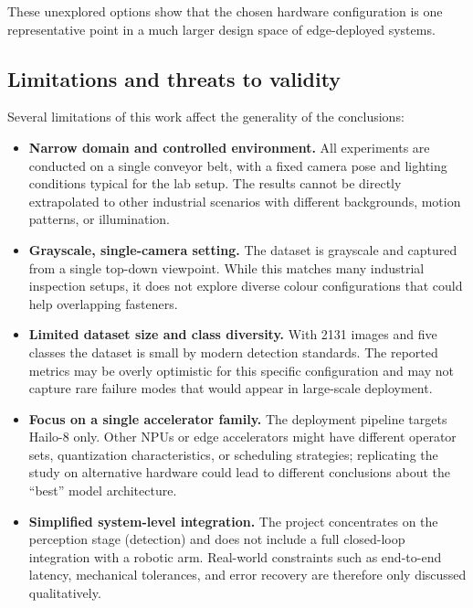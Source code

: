 \documentclass[12pt,a4paper]{report}
\begin{document}
These unexplored options show that the chosen hardware configuration is one
representative point in a much larger design space of edge-deployed systems.


\subsection{Limitations and threats to validity}

Several limitations of this work affect the generality of the conclusions:

\begin{itemize}[leftmargin=1.5em]
    \item \textbf{Narrow domain and controlled environment.}
          All experiments are conducted on a single conveyor belt, with a fixed camera pose
          and lighting conditions typical for the lab setup.
          The results cannot be directly extrapolated to other industrial scenarios with
          different backgrounds, motion patterns, or illumination.

    \item \textbf{Grayscale, single-camera setting.}
          The dataset is grayscale and captured from a single top-down viewpoint.
          While this matches many industrial inspection setups, it does not explore diverse
          colour configurations that could help overlapping fasteners.

    \item \textbf{Limited dataset size and class diversity.}
          With 2131 images and five classes the dataset is small by modern detection standards.
          The reported metrics may be overly optimistic for this specific configuration and may
          not capture rare failure modes that would appear in large-scale deployment.

    \item \textbf{Focus on a single accelerator family.}
          The deployment pipeline targets Hailo-8 only.
          Other NPUs or edge accelerators might have different operator sets, quantization
          characteristics, or scheduling strategies; replicating the study on alternative hardware
          could lead to different conclusions about the \enquote{best} model architecture.

    \item \textbf{Simplified system-level integration.}
          The project concentrates on the perception stage (detection) and does not include a
          full closed-loop integration with a robotic arm.
          Real-world constraints such as end-to-end latency, mechanical tolerances, and error
          recovery are therefore only discussed qualitatively.
\end{itemize}
\end{document}
